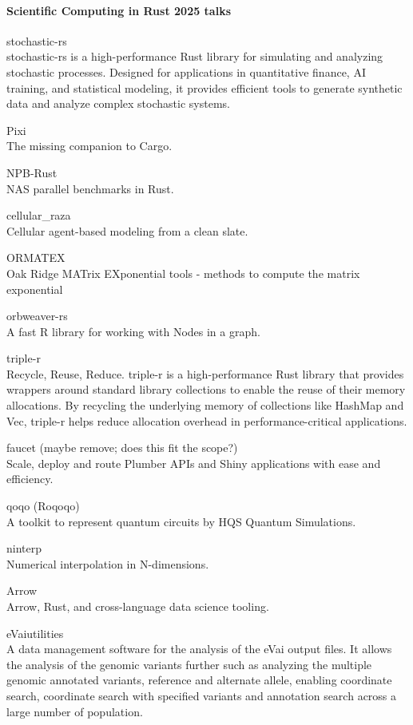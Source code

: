 \documentclass{article}
\begin{document}
\paragraph{Scientific Computing in Rust 2025 talks}

stochastic-rs\\
stochastic-rs is a high-performance Rust library for simulating and analyzing
stochastic processes. Designed for applications in quantitative finance, AI training, and
statistical modeling, it provides efficient tools to generate synthetic data and analyze complex
stochastic systems.

Pixi\\
The missing companion to Cargo.

NPB-Rust\\
NAS parallel benchmarks in Rust. \cite{martins2025npbrustnasparallelbenchmarks}

cellular\_raza\\
Cellular agent-based modeling from a clean slate.

ORMATEX\\
Oak Ridge MATrix EXponential tools - methods to compute the matrix exponential

orbweaver-rs\\
A fast R library for working with Nodes in a graph.

triple-r\\
Recycle, Reuse, Reduce. triple-r is a high-performance Rust library that provides
wrappers around standard library collections to enable the reuse of their memory allocations. By
recycling the underlying memory of collections like HashMap and Vec, triple-r helps reduce
allocation overhead in performance-critical applications.

faucet (maybe remove; does this fit the scope?)\\
Scale, deploy and route Plumber APIs and Shiny
applications with ease and efficiency.

qoqo (Roqoqo)\\
A toolkit to represent quantum circuits by HQS Quantum Simulations.

ninterp\\
Numerical interpolation in N-dimensions.

Arrow\\
Arrow, Rust, and cross-language data science tooling.

eVaiutilities\\
A data management software for the analysis of the eVai output files. It allows the
analysis of the genomic variants further such as analyzing the multiple genomic annotated variants,
reference and alternate allele, enabling coordinate search, coordinate search with specified
variants and annotation search across a large number of population.
\end{document}
